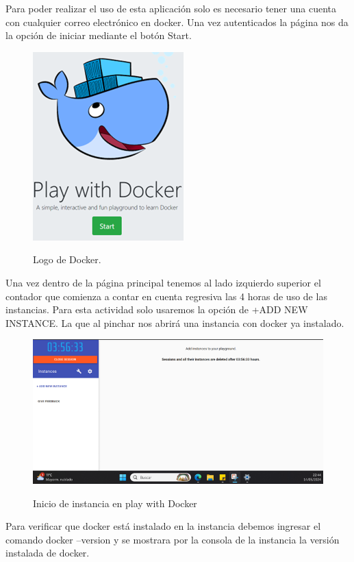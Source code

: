 \documentclass[stu, 11pt, letterpaper, donotrepeattitle, floatsintext, natbib]{apa7}
\begin{document}
Para poder realizar el uso de esta aplicación solo es necesario tener una cuenta con cualquier correo electrónico en docker. Una vez autenticados la página nos da la opción de iniciar mediante el botón Start.

\begin{figure}[H]
    \centering
    \caption{Logo de Docker.}
    \includegraphics[width=0.3\linewidth]{docker1.png} %
    \label{fig:OverallEffect}
\end{figure}

Una vez dentro de la página principal tenemos al lado izquierdo superior el contador que comienza a contar en cuenta regresiva las 4 horas de uso de las instancias. Para esta actividad solo usaremos la opción de +ADD NEW INSTANCE. La que al pinchar nos abrirá una instancia con docker ya instalado. 

\begin{figure}[H]
    \centering
    \caption{Inicio de instancia en play with Docker}
    \includegraphics[width=0.75\linewidth]{docker2.png} %
    \label{fig:OverallEffect}
\end{figure}

Para verificar que docker está instalado en la instancia debemos ingresar el comando docker –version y se mostrara por la consola de la instancia la versión instalada de docker.
\end{document}
